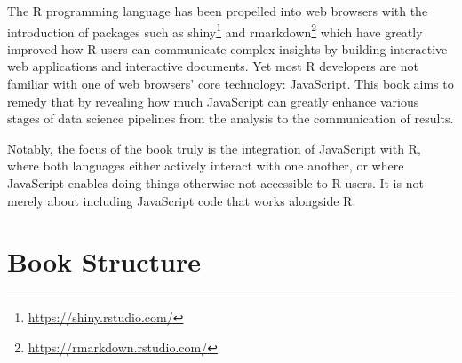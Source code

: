 \documentclass[10pt,]{krantz}
\renewcommand{\href}[2]{#2\footnote{\url{#1}}}
\begin{document}
The R programming language has been propelled into web browsers with the introduction of packages such as \href{https://shiny.rstudio.com/}{shiny} \citep{R-shiny} and \href{https://rmarkdown.rstudio.com/}{rmarkdown} \citep{R-rmarkdown} which have greatly improved how R users can communicate complex insights by building interactive web applications and interactive documents. Yet most R developers are not familiar with one of web browsers' core technology: JavaScript. This book aims to remedy that by revealing how much JavaScript can greatly enhance various stages of data science pipelines from the analysis to the communication of results.

Notably, the focus of the book truly is the integration of JavaScript with R, where both languages either actively interact with one another, or where JavaScript enables doing things otherwise not accessible to R users. It is not merely about including JavaScript code that works alongside R.

\hypertarget{book-structure}{%
\section*{Book Structure}\label{book-structure}}
\end{document}
